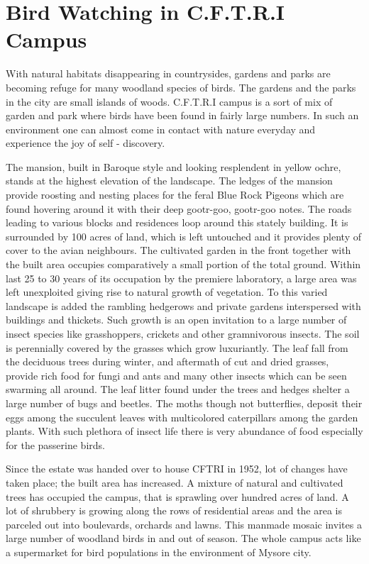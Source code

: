 \chapter{Bird Watching in C.F.T.R.I Campus}%

With natural habitats disappearing in countrysides, gardens and parks 
are becoming refuge for many woodland species of birds. The gardens and 
the parks in the city are small islands of woods. C.F.T.R.I campus is a sort of 
mix of garden and park where birds have been found in fairly large numbers. 
In such an environment one can almost come in contact with nature 
everyday and experience the joy of self - discovery. 

The mansion, built in Baroque style and looking resplendent in yellow 
ochre, stands at the highest elevation of the landscape. The ledges of the 
mansion provide roosting and nesting places for the feral Blue Rock Pigeons 
which are found hovering around it with their deep gootr-goo, gootr-goo 
notes. The roads leading to various blocks and residences loop around this 
stately building. It is surrounded by 100 acres of land, which is left 
untouched and it provides plenty of cover to the avian neighbours. The 
cultivated garden in the front together with the built area occupies 
comparatively a small portion of the total ground. Within last 25 to 30 years 
of its occupation by the premiere laboratory, a large area was left 
unexploited giving rise to natural growth of vegetation. To this varied 
landscape is added the rambling hedgerows and private gardens interspersed 
with buildings and thickets. Such growth is an open invitation to a large 
number of insect species like grasshoppers, crickets and other gramnivorous 
insects. The soil is perennially covered by the grasses which grow 
luxuriantly. The leaf fall from the deciduous trees during winter, and 
aftermath of cut and dried grasses, provide rich food for fungi and ants and 
many other insects which can be seen swarming all around. The leaf litter 
found under the trees and hedges shelter a large number of bugs and beetles. 
The moths though not butterflies, deposit their eggs among the succulent 
leaves with multicolored caterpillars among the garden plants. With such 
plethora of insect life there is very abundance of food especially for the 
passerine birds. 

Since the estate was handed over to house CFTRI in 1952, lot of 
changes have taken place; the built area has increased. A mixture of natural 
and cultivated trees has occupied the campus, that is sprawling over hundred 
acres of land. A lot of shrubbery is growing along the rows of residential 
areas and the area is parceled out into boulevards, orchards and lawns. This 
manmade mosaic invites a large number of woodland birds in and out of 
season. The whole campus acts like a supermarket for bird populations in 
the environment of Mysore city. 

